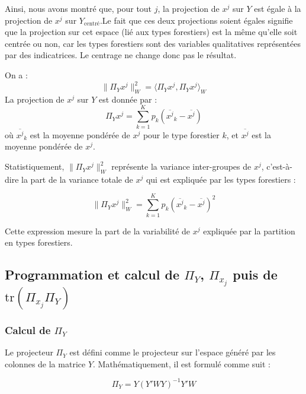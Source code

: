 \documentclass[
]{article}
\begin{document}
Ainsi, nous avons montré que, pour tout \(j\), la projection de \(x^j\)
sur \(Y\) est égale à la projection de \(x^j\) sur
\(Y_{\text{centré}}\).\newline Le fait que ces deux projections soient
égales signifie que la projection sur cet espace (lié aux types
forestiers) est la même qu'elle soit centrée ou non, car les types
forestiers sont des variables qualitatives représentées par des
indicatrices. Le centrage ne change donc pas le résultat.

On a : \[
\| \Pi_Y x^j \|_W^2 = \langle \Pi_Y x^j, \Pi_Y x^j \rangle_W
\] La projection de \(x^j\) sur \(Y\) est donnée par : \[
\Pi_Y x^j = \sum_{k=1}^{K} p_k (\overline{x^j}_k - \overline{x^j})
\] où \(\overline{x^j}_k\) est la moyenne pondérée de \(x^j\) pour le
type forestier \(k\), et \(\overline{x^j}\) est la moyenne pondérée de
\(x^j\).

Statistiquement, \(\| \Pi_Y x^j \|_W^2\) représente la variance
inter-groupes de \(x^j\), c'est-à-dire la part de la variance totale de
\(x^j\) qui est expliquée par les types forestiers :

\[
\| \Pi_Y x^j \|_W^2 = \sum_{k=1}^{K} p_k (\overline{x^j}_k - \overline{x^j})^2
\]

Cette expression mesure la part de la variabilité de \(x^j\) expliquée
par la partition en types forestiers.

\hypertarget{programmation-et-calcul-de-pi_y-pi_x_j-puis-de-texttrpi_x_j-pi_y}{%
\subsection{\texorpdfstring{Programmation et calcul de \(\Pi_Y\),
\(\Pi_{x_j}\) puis de
\(\text{tr}(\Pi_{x_j} \Pi_Y)\)}{Programmation et calcul de \textbackslash Pi\_Y, \textbackslash Pi\_\{x\_j\} puis de \textbackslash text\{tr\}(\textbackslash Pi\_\{x\_j\} \textbackslash Pi\_Y)}}\label{programmation-et-calcul-de-pi_y-pi_x_j-puis-de-texttrpi_x_j-pi_y}}

\hypertarget{calcul-de-pi_y}{%
\subsubsection{\texorpdfstring{Calcul de
\(\Pi_Y\)}{Calcul de \textbackslash Pi\_Y}}\label{calcul-de-pi_y}}

Le projecteur \(\Pi_Y\) est défini comme le projecteur sur l'espace
généré par les colonnes de la matrice \(Y\). Mathématiquement, il est
formulé comme suit :

\[
   \Pi_Y = Y \left( Y' W Y \right)^{-1} Y' W
   \]
\end{document}
